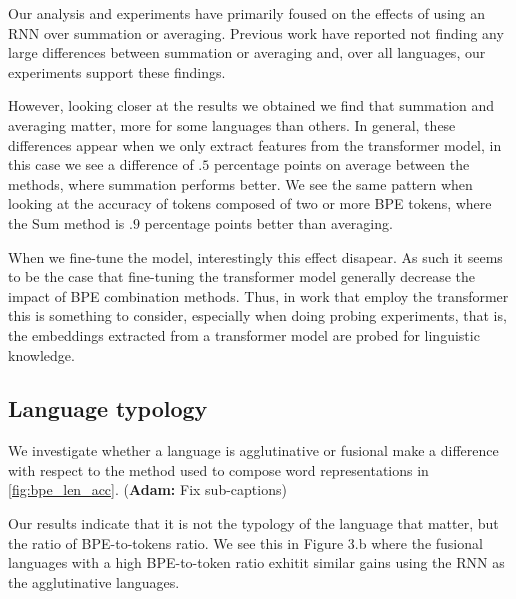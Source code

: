 \documentclass[11pt]{article}
\newcommand\adam[1]{(\textbf{Adam:} #1)}
\begin{document}
        Our analysis and experiments have primarily foused on the
     effects of using an RNN over summation or averaging. Previous
     work have reported not finding any large differences between
     summation or averaging and, over all languages, our experiments
     support these findings.

            However, looking closer at the results we obtained
     we find that summation and averaging matter, more for some
     languages than others. In general, these differences appear when
     we only extract features from the transformer model, in this case
     we see a difference of $.5$ percentage points on average between
     the methods, where summation performs better. We see the
     same pattern when looking at the accuracy of tokens composed of
     two or more BPE tokens, where the Sum method is $.9$ percentage
     points better than averaging.

             When we fine-tune the model, interestingly this effect
     disapear. As such it seems to be the case that fine-tuning the
     transformer model generally decrease the impact of BPE
     combination methods. Thus, in work that employ the transformer
     this is something to consider, especially when doing probing
     experiments, that is, the embeddings extracted from a transformer
     model are probed for linguistic knowledge.

    \subsection{Language typology}


        We investigate whether a language is agglutinative or fusional
     make a difference with respect to the method used to compose word
     representations in \cref{fig:bpe_len_acc}. \adam{Fix sub-captions}

            Our results indicate that it is not the typology of the
     language that matter, but the ratio of BPE-to-tokens ratio. We
     see this in Figure 3.b where the fusional languages with a high
     BPE-to-token ratio exhitit similar gains using the RNN as the
     agglutinative languages.

    
\end{document}
